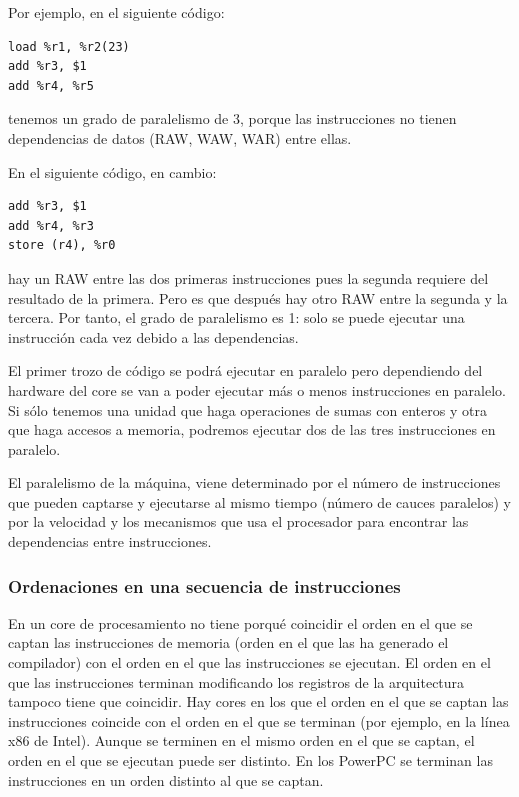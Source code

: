 \documentclass[10pt,a4paper,spanish]{report}
\begin{document}
Por ejemplo, en el siguiente código:
\begin{verbatim}
load %r1, %r2(23)
add %r3, $1
add %r4, %r5
\end{verbatim}

tenemos un grado de paralelismo de 3, porque las instrucciones no tienen dependencias de datos (RAW, WAW, WAR) entre ellas. 

En el siguiente código, en cambio:
\begin{verbatim}
add %r3, $1
add %r4, %r3
store (r4), %r0
\end{verbatim}

hay un RAW entre las dos primeras instrucciones pues la segunda requiere del resultado de la primera. Pero es que después hay otro RAW entre la segunda y la tercera. Por tanto, el grado de paralelismo es 1: solo se puede ejecutar una instrucción cada vez debido a las dependencias.

El primer trozo de código se podrá ejecutar en paralelo pero dependiendo del hardware del core se van a poder ejecutar más o menos instrucciones en paralelo. Si sólo tenemos una unidad que haga operaciones de sumas con enteros y otra que haga accesos a memoria, podremos ejecutar dos de las tres instrucciones en paralelo. 

El paralelismo de la máquina, viene determinado por el número de instrucciones que pueden captarse y ejecutarse al mismo tiempo (número de cauces paralelos) y por la velocidad y los mecanismos que usa el procesador para encontrar las dependencias entre instrucciones.

\textcolor{azul}{\subsubsection{Ordenaciones en una secuencia de instrucciones}}
En un core de procesamiento no tiene porqué coincidir el orden en el que se captan las instrucciones de memoria (orden en el que las ha generado el compilador) con el orden en el que las instrucciones se ejecutan. El orden en el que las instrucciones terminan modificando los registros de la arquitectura tampoco tiene que coincidir. Hay cores en los que el orden en el que se captan las instrucciones coincide con el orden en el que se terminan (por ejemplo, en la línea x86 de Intel). Aunque se terminen en el mismo orden en el que se captan, el orden en el que se ejecutan puede ser distinto. En los PowerPC se terminan las instrucciones en un orden distinto al que se captan.
\end{document}
